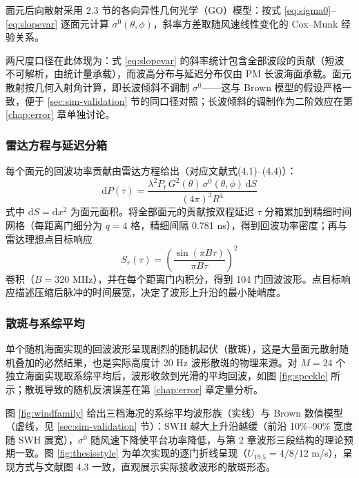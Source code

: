 \documentclass[a4paper]{article}
\newcommand{\reffig}[1]{图 \ref{#1}}
\begin{document}
面元后向散射采用 2.3 节的各向异性几何光学（GO）模型：按式 \eqref{eq:sigma0}--\eqref{eq:slopevar} 逐面元计算 $\sigma^0(\theta, \phi)$，斜率方差取随风速线性变化的 Cox--Munk 经验关系\cite{coxmunk1954}。

两尺度口径在此体现为：式 \eqref{eq:slopevar} 的斜率统计包含全部波段的贡献（短波不可解析，由统计量承载），而波高分布与延迟分布仅由 PM 长波海面承载。面元散射按几何入射角计算，即长波倾斜不调制 $\sigma^0$——这与 Brown 模型的假设严格一致，便于 \ref{sec:sim-validation} 节的同口径对照；长波倾斜的调制作为二阶效应在第 \ref{chap:error} 章单独讨论。

\subsubsection{雷达方程与延迟分箱}

每个面元的回波功率贡献由雷达方程给出（对应文献\cite{refpaper}式(4.1)--(4.4)）：
\begin{equation}
	\mathrm{d} P(\tau) = \frac{\lambda^{2} P_t\, G^{2}(\theta)\, \sigma^0(\theta, \phi)\, \mathrm{d}S}{(4 \pi)^{3} R^{4}}
	\label{eq:radar}
\end{equation}
式中 $\mathrm{d}S = \mathrm{d}x^{2}$ 为面元面积。将全部面元的贡献按双程延迟 $\tau$ 分箱累加到精细时间网格（每距离门细分为 $q = 4$ 格，精细间隔 0.781 ns），得到回波功率密度；再与雷达理想点目标响应
\begin{equation}
	S_r(\tau) = \left( \frac{\sin(\pi B \tau)}{\pi B \tau} \right)^{2}
	\label{eq:ptr}
\end{equation}
卷积（$B = 320$ MHz），并在每个距离门内积分，得到 104 门回波波形。点目标响应描述压缩后脉冲的时间展宽，决定了波形上升沿的最小陡峭度。

\subsubsection{散斑与系综平均}

单个随机海面实现的回波波形呈现剧烈的随机起伏（散斑），这是大量面元散射随机叠加的必然结果，也是实际高度计 20 Hz 波形散斑的物理来源。对 $M = 24$ 个独立海面实现取系综平均后，波形收敛到光滑的平均回波，如\reffig{fig:speckle} 所示；散斑导致的随机反演误差在第 \ref{chap:error} 章定量分析。

\reffig{fig:windfamily} 给出三档海况的系综平均波形族（实线）与 Brown 数值模型（虚线，见 \ref{sec:sim-validation} 节）：SWH 越大上升沿越缓（前沿 10\%--90\% 宽度随 SWH 展宽），$\sigma^0$ 随风速下降使平台功率降低，与第 2 章波形三段结构的理论预期一致。\reffig{fig:thesisstyle} 为单次实现的逐门折线呈现（$U_{19.5} = 4/8/12$ m/s），呈现方式与文献\cite{refpaper}图 4.3 一致，直观展示实际接收波形的散斑形态。
\end{document}
